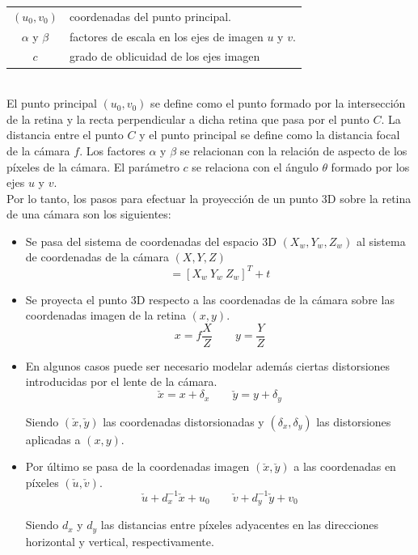 \begin{tabular}{cp{}}


$(u_0, v_0)$ &  coordenadas del punto principal. \\ 
$\alpha$ y $\beta$ & factores de escala en los ejes de imagen  $u$ y $v$. \\ 
$c$ & grado de oblicuidad de los ejes imagen
\end{tabular} \\

El punto principal $(u_0, v_0)$ se define como el punto formado por la intersección de la retina y la recta perpendicular a dicha retina que pasa por el punto $C$. La distancia entre el punto $C$ y el punto principal se define como la distancia focal de la cámara $f$. Los factores $\alpha$ y $\beta$ se relacionan con la relación de aspecto de los píxeles de la cámara. El parámetro $c$ se relaciona con el ángulo $\theta$ formado por los ejes $u$ y $v$.\\

Por lo tanto, los pasos para efectuar la proyección de un punto 3D sobre la retina de una cámara son los siguientes:\\

\begin{itemize}
\item Se pasa del sistema de coordenadas del espacio 3D $(X_w, Y_w, Z_w)$ al sistema de coordenadas de la cámara $(X,Y, Z)$
\begin{equation}
[X \ Y \ Z] = [X_w \ Y_w \ Z_w]^T + t
\end{equation}
\item Se proyecta el punto 3D respecto a las coordenadas de la cámara sobre las coordenadas imagen de la retina $(x,y)$.
\begin{equation}
x=f \dfrac{X}{Z} \qquad y = \dfrac{Y}{Z}
\end{equation}
\item En algunos casos puede ser necesario modelar además ciertas distorsiones introducidas por el lente de la cámara.
\begin{equation}
\check{x} = x + \delta_x \qquad \check{y} = y + \delta_y
\end{equation}

Siendo $(\check{x},\check{y})$ las coordenadas distorsionadas y $(\delta_x, \delta_y)$ las distorsiones aplicadas a $(x,y)$.

\item Por último se pasa de la coordenadas imagen $(\check{x}, \check{y})$ a las coordenadas en píxeles $(\check{u}, \check{v})$.
\vspace{-0.05cm}
\begin{equation}
\check{u} + d_x ^{-1}\check{x} + u_0 \qquad \check{v} + d_y ^{-1}\check{y} + v_0
\end{equation}

Siendo $d_x$ y $d_y$ las distancias entre píxeles adyacentes en las direcciones horizontal y vertical, respectivamente.\\
\end{itemize}


